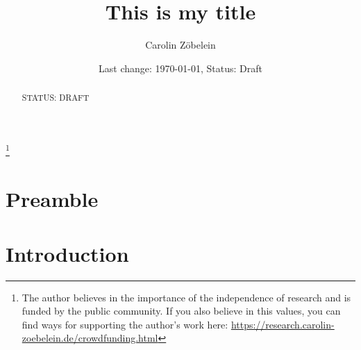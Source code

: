 \documentclass{amsart}
\theoremstyle{definition}
\theoremstyle{remark}
\numberwithin{equation}{section}
\begin{document}
\title{This is my title}
\author{Carolin Z\"obelein}
\address{Carolin Z\"obelein, Independent mathematical scientist, Josephsplatz 8, 90403 N\"urnberg, Germany, \url{https://research.carolin-zoebelein.de}}
\thanks{The author believes in the importance of the independence of research and is funded by the public community. If you also believe in this values, you can find ways for supporting the author's work here: \url{https://research.carolin-zoebelein.de/crowdfunding.html}}
\date{Last change: \today, Status: Draft}
\begin{abstract} %
STATUS: DRAFT
\end{abstract}
\maketitle
\section*{Preamble}
\label{s:preamble}


\section{Introduction}
\label{s:introduction}



\end{document}
